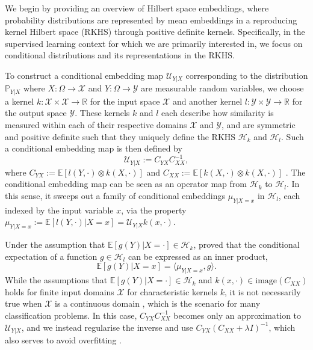 \documentclass{article}
\begin{document}
	We begin by providing an overview of Hilbert space embeddings, where probability distributions are represented by mean embeddings in a reproducing kernel Hilbert space (RKHS) through positive definite kernels. Specifically, in the supervised learning context for which we are primarily interested in, we focus on conditional distributions and its representations in the RKHS.
	
	To construct a conditional embedding map $\mathcal{U}_{Y | X}$ corresponding to the distribution $\mathbb{P}_{Y | X}$ where $X : \Omega \to \mathcal{X}$ and $Y: \Omega \to \mathcal{Y}$ are measurable random variables, we choose a kernel $k : \mathcal{X} \times \mathcal{X} \to \mathbb{R}$ for the input space $\mathcal{X}$ and another kernel $l : \mathcal{Y} \times \mathcal{Y} \to \mathbb{R}$ for the output space $\mathcal{Y}$. These kernels $k$ and $l$ each describe how similarity is measured within each of their respective domains $\mathcal{X}$ and $\mathcal{Y}$, and are symmetric and positive definite such that they uniquely define the RKHS $\mathcal{H}_{k}$ and $\mathcal{H}_{l}$. Such a conditional embedding map is then defined by
	\begin{equation}
		\mathcal{U}_{Y | X} := C_{YX} C_{XX}^{-1},
	\label{eq:conditional_embedding}
	\end{equation}
	where $C_{YX} := \mathbb{E}[l(Y, \cdot) \otimes k(X, \cdot)]$ and $C_{XX} := \mathbb{E}[k(X, \cdot) \otimes k(X, \cdot)]$ \citep{song2009hilbert}. The conditional embedding map can be seen as an operator map from $\mathcal{H}_{k}$ to $\mathcal{H}_{l}$. In this sense, it sweeps out a family of conditional embeddings $\mu_{Y | X = x}$ in $\mathcal{H}_{l}$, each indexed by the input variable $x$, via the property $\mu_{Y | X = x} := \mathbb{E}[l(Y, \cdot) | X = x] = \mathcal{U}_{Y | X} k(x, \cdot)$.
	
	Under the assumption that $\mathbb{E}[g(Y) | X = \cdot] \in \mathcal{H}_{k}$, \cite{song2009hilbert} proved that the conditional expectation of a function $g \in \mathcal{H}_{l}$ can be expressed as an inner product,  %
	\begin{equation}
		\mathbb{E}[g(Y) | X = x] = \langle \mu_{Y | X = x}, g \rangle.
	\label{eq:conditional_expectation}
	\end{equation}
	While the assumptions that $\mathbb{E}[g(Y) | X = \cdot] \in \mathcal{H}_{k}$ and $k(x, \cdot) \in \mathrm{image}(C_{XX})$ holds for finite input domains $\mathcal{X}$ for characteristic kernels $k$, it is not necessarily true when $\mathcal{X}$ is a continuous domain \citep{fukumizu2004dimensionality}, which is the scenario for many classification problems. In this case, $C_{YX} C_{XX}^{-1}$ becomes only an approximation to $\mathcal{U}_{Y | X}$, and we instead regularise the inverse and use $C_{YX} (C_{XX} + \lambda I)^{-1}$, which also serves to avoid overfitting \citep[p. 13]{song2013kernel}.
	
\end{document}
